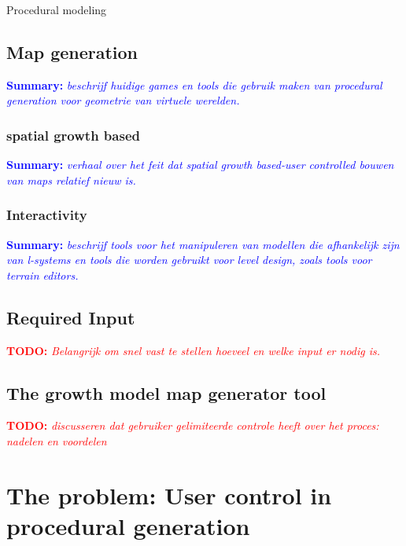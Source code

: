 \documentclass{article}
\newcommand{\todo}[1]{\textcolor{red}{\textbf{\newline TODO: }\it{#1} \newline}}
\newcommand{\inhoud}[1]{\textcolor{blue}{\textbf{\newline Summary: }\it{#1}}}
\begin{document}
Procedural modeling                        


\subsection{Map generation}
\inhoud{beschrijf huidige games en tools die gebruik maken van procedural generation voor geometrie van virtuele werelden.}

\subsubsection{spatial growth based}
\inhoud{verhaal over het feit dat spatial growth based-user controlled bouwen van maps relatief nieuw is.}

\subsubsection{Interactivity}
\inhoud{beschrijf tools voor het manipuleren van modellen die afhankelijk zijn van l-systems en tools die worden 
	gebruikt voor level design, zoals tools voor terrain editors.}


\subsection{Required Input}
\todo{Belangrijk om snel vast te stellen hoeveel en welke input er nodig is.}


\subsection{The growth model map generator tool}
\todo{discusseren dat gebruiker gelimiteerde controle heeft over het proces: nadelen en voordelen}

   
\section{The problem: User control in procedural generation}
\end{document}
